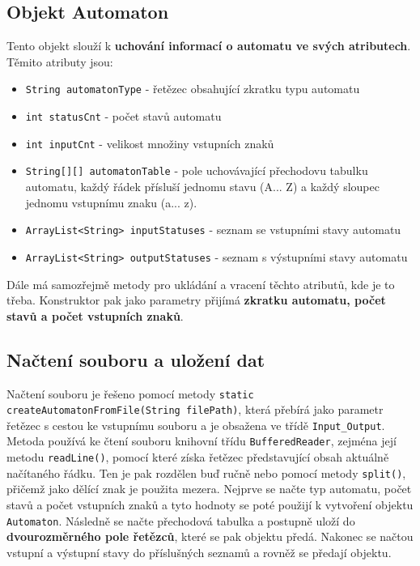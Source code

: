 \documentclass[11pt]{article}
\begin{document}
\subsection{Objekt Automaton}
Tento objekt slouží k \textbf{uchování informací o automatu ve svých atributech}. Těmito atributy jsou:

\begin{itemize}
\item \texttt{String automatonType} - řetězec obsahující zkratku typu automatu
\item \texttt{int statusCnt} - počet stavů automatu 
\item \texttt{int inputCnt} - velikost množiny vstupních znaků
\item \texttt{String[][] automatonTable} - pole uchovávající přechodovu tabulku automatu, každý řádek přísluší jednomu stavu (A... Z) a každý sloupec jednomu vstupnímu znaku (a... z).
\item \texttt{ArrayList<String> inputStatuses} - seznam se vstupními stavy automatu
\item \texttt{ArrayList<String> outputStatuses} - seznam s výstupními stavy automatu
\end{itemize}

Dále má samozřejmě metody pro ukládání a vracení těchto atributů, kde je to třeba. Konstruktor pak jako parametry přijímá \textbf{zkratku automatu, počet stavů a počet vstupních znaků}.

\subsection{Načtení souboru a uložení dat}
Načtení souboru je řešeno pomocí metody \texttt{static createAutomatonFromFile(String filePath)}, která přebírá jako parametr řetězec s cestou ke vstupnímu souboru a je obsažena ve třídě \texttt{Input\_Output}. Metoda používá ke čtení souboru knihovní třídu \texttt{BufferedReader}, zejména její metodu \texttt{readLine()}, pomocí které získa řetězec představující obsah aktuálně načítaného řádku. Ten je pak rozdělen buď ručně nebo pomocí metody \texttt{split()}, přičemž jako dělící znak je použita mezera. Nejprve se načte typ automatu, počet stavů a počet vstupních znaků a tyto hodnoty se poté použijí k vytvoření objektu \texttt{Automaton}. Následně se načte přechodová tabulka a postupně uloží do \textbf{dvourozměrného pole řetězců}, které se pak objektu předá. Nakonec se načtou vstupní a výstupní stavy do příslušných seznamů a rovněž se předají objektu.
\end{document}
